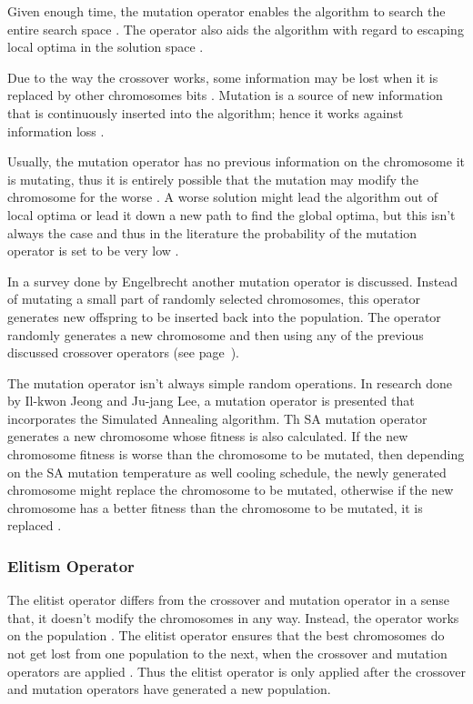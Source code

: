 Given enough time, the mutation operator enables the algorithm to search the entire search space \cite{FamilyGA}. The operator also aids the algorithm with regard to escaping local optima in the solution space \cite{FamilyGA}.

Due to the way the crossover works, some information may be lost when it is replaced by other chromosomes bits \cite{AcceleratingGA,ConstrainedGA}. Mutation is a source of new information that is continuously inserted into the algorithm; hence it works against information loss \cite{CoactiveFuzzyGA,AcceleratingGA,ConstrainedGA}. 

Usually, the mutation operator has no previous information on the chromosome it is mutating, thus it is entirely possible that the mutation may modify the chromosome for the worse \cite{AcceleratingGA}. A worse solution might lead the algorithm out of local optima or lead it down a new path to find the global optima, but this isn't always the case and thus in the literature the probability of the mutation operator is set to be very low \cite{AdaptiveSAGA,FamilyGA,ConstrainedGA}.

In a survey done by Engelbrecht\cite{CompuIntelligenceIntro} another mutation operator is discussed. Instead of mutating a small part of randomly selected chromosomes, this operator generates new offspring to be inserted back into the population. The operator randomly generates a new chromosome and then using any of the previous discussed crossover operators (see page~\pageref{sec:crossover}).

The mutation operator isn't always simple random operations. In research done by Il-kwon Jeong and Ju-jang Lee, a mutation operator is presented that incorporates the Simulated Annealing algorithm. Th SA mutation operator generates a new chromosome whose fitness is also calculated. If the new chromosome fitness is worse than the chromosome to be mutated, then depending on the SA mutation temperature as well cooling schedule, the newly generated chromosome might replace the chromosome to be mutated, otherwise if the new chromosome has a better fitness than the chromosome to be mutated, it is replaced \cite{AdaptiveSAGA}.

\subsubsection{Elitism Operator}
The elitist operator differs from the crossover and mutation operator in a sense that, it doesn't modify the chromosomes in any way. Instead, the operator works on the population \cite{PatternDetectionGA}. The elitist operator ensures that the best chromosomes do not get lost from one population to the next, when the crossover and mutation operators are applied \cite{HetergeneousGA}. Thus the elitist operator is only applied after the crossover and mutation operators have generated a new population. 

